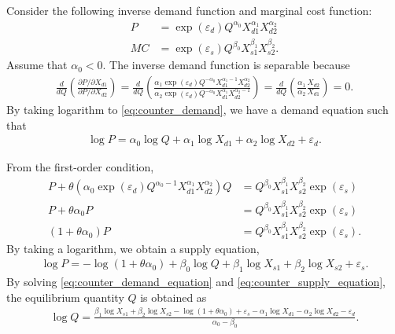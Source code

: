 \documentclass[11pt, a4paper]{article}
\theoremstyle{remark}
\begin{document}
Consider the following inverse demand function and marginal cost function:
\begin{align}
    P & = \exp(\varepsilon_{d}) Q^{\alpha_0} X_{d1}^{\alpha_1}X_{d2}^{\alpha_2}\label{eq:counter_demand}\\
    MC & = \exp(\varepsilon_{s})Q^{\beta_0} X_{s1}^{\beta_1} X_{s2}^{\beta_2}.\label{eq:counter_mc}
\end{align}
Assume that $\alpha_0 <0$.
The inverse demand function is separable because
\begin{align}
    \frac{d}{dQ} \left(\frac{\partial P/\partial X_{d1}}{\partial P/\partial X_{d2}} \right) = \frac{d}{dQ} \left(\frac{\alpha_{1}\exp(\varepsilon_{d}) Q^{-\alpha_0} X_{d1}^{\alpha_1-1}X_{d2}^{\alpha_2}}{\alpha_2\exp(\varepsilon_{d}) Q^{-\alpha_0} X_{d1}^{\alpha_1}X_{d2}^{\alpha_2-1}} \right) =  \frac{d}{dQ}\left(\frac{\alpha_1}{\alpha_2} \frac{X_{d2}}{X_{d1}} \right)=0.
\end{align}
By taking logarithm to \eqref{eq:counter_demand}, we have a demand equation such that 
\begin{align}
    \log P = \alpha_0 \log Q + \alpha_1 \log X_{d1}  + \alpha_2 \log X_{d2} + \varepsilon_{d}.\label{eq:counter_demand_equation}
\end{align}


From the first-order condition, 
\begin{align}
    P + \theta (\alpha_0 \exp(\varepsilon_{d})Q^{\alpha_0-1}X_{d1}^{\alpha_1}X_{d2}^{\alpha_2}) Q & = Q^{\beta_0} X_{s1}^{\beta_1}X_{s2}^{\beta_2}\exp(\varepsilon_{s})\\
    P + \theta \alpha_0 P & = Q^{\beta_0} X_{s1}^{\beta_1}X_{s2}^{\beta_2}\exp(\varepsilon_{s})\\
    (1 + \theta\alpha_0) P & = Q^{\beta_0} X_{s1}^{\beta_1}X_{s2}^{\beta_2}\exp(\varepsilon_{s}).
\end{align}
By taking a logarithm, we obtain a supply equation,
\begin{align}
    \log P = - \log(1 + \theta\alpha_0) + \beta_0 \log Q + \beta_1 \log X_{s1}+\beta_2 \log X_{s2} + \varepsilon_{s}.\label{eq:counter_supply_equation}
\end{align}
By solving \eqref{eq:counter_demand_equation} and \eqref{eq:counter_supply_equation}, the equilibrium quantity $Q$ is obtained as
\begin{align}
    \log Q = \frac{\beta_1 \log X_{s1}+\beta_2 \log X_{s2} - \log(1 + \theta\alpha_0)+ \varepsilon_{s} - \alpha_1 \log X_{d1}  - \alpha_2 \log X_{d2} - \varepsilon_{d} }{\alpha_0 - \beta_0}.
\end{align}
\end{document}
